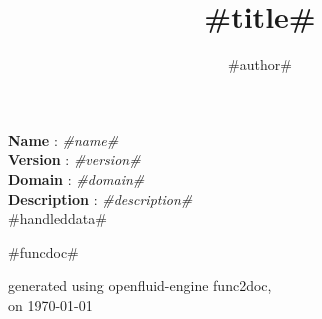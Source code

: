 \documentclass[a4paper,10pt]{article}
\title{#title#}
\author{#author#}
\date{}
\begin{document}
\maketitle

\noindent \textbf{Name} : \textit{#name#}\\
\noindent \textbf{Version} : \textit{#version#}\\
\noindent \textbf{Domain} : \textit{#domain#}\\
\noindent \textbf{Description} : \textit{#description#}\\

#handleddata#

\bigskip
\bigskip

\begin{multicols}{2}

#funcdoc#

\end{multicols}

\bigskip
\bigskip
\small
\begin{flushright}generated using openfluid-engine func2doc,\\
on \today\end{flushright}
\small
\end{document}
